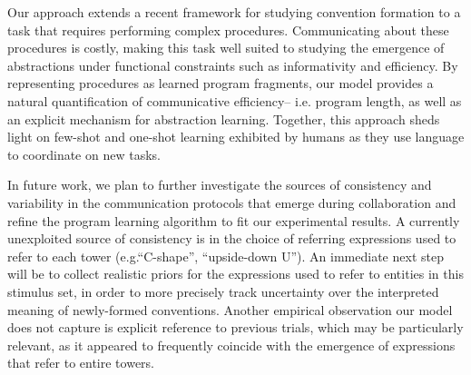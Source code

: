\documentclass[10pt,letterpaper]{article}
\begin{document}
Our approach extends a recent framework for studying convention formation \cite{HawkinsFrankGoodman17_ConventionFormation} to a task that requires performing complex procedures.
Communicating about these procedures is costly, making this task well suited to studying the emergence of abstractions under functional constraints such as informativity and efficiency.
By representing procedures as learned program fragments, our model provides a natural quantification of communicative efficiency-- i.e. program length, as well as an explicit mechanism for abstraction learning.
Together, this approach sheds light on few-shot and one-shot learning exhibited by humans as they use language to coordinate on new tasks.





In future work, we plan to further investigate the sources of consistency and variability in the communication protocols that emerge during collaboration and refine the program learning algorithm to fit our experimental results.
A currently unexploited source of consistency is in the choice of referring expressions used to refer to each tower (e.g.``C-shape'', ``upside-down U'').
An immediate next step will be to collect realistic priors for the expressions used to refer to entities in this stimulus set, in order to more precisely track uncertainty over the interpreted meaning of newly-formed conventions.
Another empirical observation our model does not capture is explicit reference to previous trials, which may be particularly relevant, as it appeared to frequently coincide with the emergence of expressions that refer to entire towers.
\end{document}
